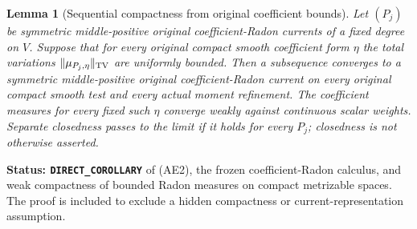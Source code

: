 \documentclass[11pt,a4paper]{article}
\numberwithin{equation}{section}
\newtheorem{lemma}[theorem]{Lemma}
\theoremstyle{definition}
\theoremstyle{remark}
\begin{document}
\begin{lemma}[Sequential compactness from original coefficient bounds]
\label{lem:r12-original-current-compactness}
Let $(P_j)$ be symmetric middle-positive original coefficient-Radon
currents of a fixed degree on $V$.  Suppose that for every original
compact smooth coefficient form $\eta$ the total variations
$\|\mu_{P_j,\eta}\|_{\rm TV}$ are uniformly bounded.  Then a
subsequence converges to a symmetric middle-positive original
coefficient-Radon current on every original compact smooth test and
every actual moment refinement.  The coefficient measures for every
fixed such $\eta$ converge weakly against continuous scalar weights.
Separate closedness passes to the limit if it holds for every $P_j$;
closedness is not otherwise asserted.
\end{lemma}

\noindent\textbf{Status: \texttt{DIRECT\_COROLLARY}} of (AE2), the
frozen coefficient-Radon calculus, and weak compactness of bounded
Radon measures on compact metrizable spaces.  The proof is included
to exclude a hidden compactness or current-representation assumption.
\end{document}
